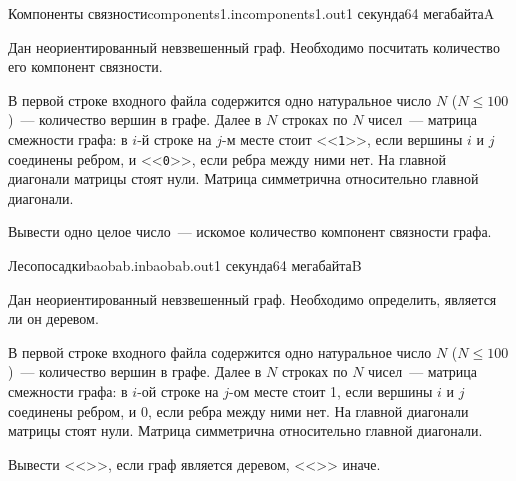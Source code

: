 \documentclass[12pt,a4paper,oneside,twocolumn,landscape]{article}
\renewcommand{\t}[1]{\ifmmode{\mathtt{#1}}\else{\texttt{#1}}\fi}
\begin{document}
\raggedbottom

\begin{problem}{Компоненты связности}{components1.in}{components1.out}{1 секунда}{64 мегабайта}{A}



Дан неориентированный невзвешенный граф. Необходимо посчитать количество его компонент связности.

\InputFile
В первой строке входного файла содержится одно натуральное число $N$ ($N \leqslant 100$)~--- количество вершин в графе. Далее в $N$ строках по $N$ чисел~--- матрица смежности графа: в $i$-й строке на $j$-м месте стоит <<\texttt{1}>>, если вершины $i$ и $j$ соединены ребром, и <<\texttt{0}>>, если ребра между ними нет. На главной диагонали матрицы стоят нули. Матрица симметрична относительно главной диагонали.

\OutputFile
Вывести одно целое число~--- искомое количество компонент связности графа.



\Example

\begin{example}
%
\end{example}


\end{problem}

\bigskip\bigskip
\begin{problem}{Лесопосадки}{baobab.in}{baobab.out}{1 секунда}{64 мегабайта}{B}



Дан неориентированный невзвешенный граф. Необходимо
определить, является ли он деревом.

\InputFile
В первой строке входного файла содержится одно
натуральное число $N$ ($N \leqslant 100$)~--- количество вершин в
графе. Далее в $N$ строках по $N$ чисел~--- матрица смежности
графа: в $i$-ой строке на $j$-ом месте стоит 1, если вершины
$i$ и $j$ соединены ребром, и 0, если ребра между ними
нет. На главной диагонали матрицы стоят нули. Матрица
симметрична относительно главной диагонали.

\OutputFile
Вывести <<\t{YES}>>, если граф является деревом, <<\t{NO}>> иначе.



\Examples

\begin{example}
%
%
\end{example}


\end{problem}
\end{document}
